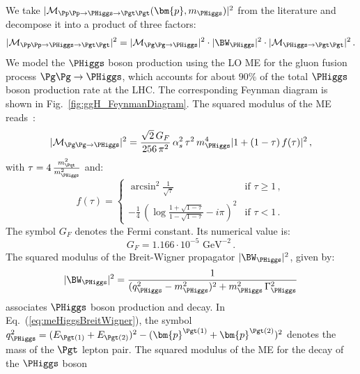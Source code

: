 We take $\vert \mathcal{M}_{\Pp\Pp \to \PHiggs \to
  \Pgt\Pgt}(\bm{p},m_{\PHiggs}) \vert^{2}$ from the literature
and decompose it into a product of three factors:
\begin{equation}
\vert \mathcal{M}_{\Pp\Pp \to \PHiggs \to \Pgt\Pgt} \vert^{2} =
 \vert \mathcal{M}_{\Pg\Pg \to \PHiggs} \vert^{2} 
\cdot \vert \BW_{\PHiggs} \vert^{2} 
\cdot \vert \mathcal{M}_{\PHiggs \to \Pgt\Pgt} \vert^{2} \, .
\label{eq:meHiggsProduction_and_Decay}
\end{equation}
We model the $\PHiggs$ boson production using the LO ME for the gluon fusion process $\Pg\Pg \to \PHiggs$,
which accounts for about $90\%$ of the total $\PHiggs$ boson production rate at the LHC.
The corresponding Feynman diagram is shown in Fig.~\ref{fig:ggH_FeynmanDiagram}.
The squared modulus of the ME reads~\cite{me_ggHprod}:
\begin{equation}
\vert \mathcal{M}_{\Pg\Pg \to \PHiggs} \vert^{2} = 
 \frac{\sqrt{2} \, G_{F}}{256 \, \pi^{2}} \, \alpha_{s}^{2} \, \tau^{2} \, m_{\PHiggs}^{4} \vert 1 + (1 - \tau) \, f(\tau) \vert^{2} \, ,
\label{eq:meHiggsProduction}
\end{equation}
with $\tau = 4\, \frac{m_{\Pqt}^{2}}{m_{\PHiggs}^{2}}$ and:
\begin{equation}
f(\tau) = 
\begin{cases} 
\arcsin^{2} \frac{1}{\sqrt{\tau}}  & \mbox{if } \tau \geq 1 \, , \\
-\frac{1}{4} \, \left( \log\frac{1 + \sqrt{1 - \tau}}{1 - \sqrt{1 - \tau}} - i\pi \right)^{2} & \mbox{if } \tau < 1 \, .
\end{cases}
\label{eq:meHiggsProduction_ftau}
\end{equation}
The symbol $G_{F}$ denotes the Fermi constant. Its numerical value is:
\begin{equation} 
G_{F} = 1.166 \cdot 10^{-5}\mbox{~GeV}^{-2} \, .
\label{eq:def_G_F} 
\end{equation}
The squared modulus of the Breit-Wigner propagator $\vert
\BW_{\PHiggs} \vert^{2}$, given by:
\begin{equation}
\vert \BW_{\PHiggs} \vert^{2} = \frac{1}{(q_{\PHiggs}^{2} -
  m_{\PHiggs}^{2})^{2} + m_{\PHiggs}^{2} \, \Gamma_{\PHiggs}^{2}} 
\label{eq:meHiggsBreitWigner}
\end{equation}
associates $\PHiggs$ boson production and decay.
In Eq.~(\ref{eq:meHiggsBreitWigner}), the symbol
$q_{\PHiggs}^{2} = (E_{\Pgt(1)} + E_{\Pgt(2)})^{2} - (\bm{p}^{\Pgt(1)} + \bm{p}^{\Pgt(2)})^{2}$ denotes the mass of the $\Pgt$ lepton pair.
The squared modulus of the ME for the decay of the $\PHiggs$ boson
